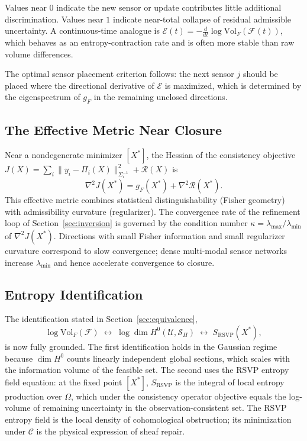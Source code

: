 \documentclass[11pt, oneside]{article}
\begin{document}
Values near $0$ indicate the new sensor or update contributes little additional
discrimination. Values near $1$ indicate near-total collapse of residual admissible
uncertainty. A continuous-time analogue is
$\mathcal{E}(t) = -\frac{d}{dt}\log \mathrm{Vol}_F(\mathcal{F}(t))$,
which behaves as an entropy-contraction rate and is often more stable than raw volume
differences.

The optimal sensor placement criterion follows: the next sensor $j$ should be placed
where the directional derivative of $\mathcal{E}$ is maximized, which is determined by
the eigenspectrum of $g_F$ in the remaining unclosed directions.

\subsection{The Effective Metric Near Closure}

Near a nondegenerate minimizer $[X^*]$, the Hessian of the consistency objective
$J(X) = \sum_i \|y_i - \Pi_i(X)\|_{\Sigma_i^{-1}}^2 + \mathcal{R}(X)$ is
\[
\nabla^2 J(X^*) = g_F(X^*) + \nabla^2 \mathcal{R}(X^*).
\]
This effective metric combines statistical distinguishability (Fisher geometry) with
admissibility curvature (regularizer). The convergence rate of the refinement loop of
Section~\ref{sec:inversion} is governed by the condition number
$\kappa = \lambda_{\max}/\lambda_{\min}$ of $\nabla^2 J(X^*)$. Directions with small
Fisher information and small regularizer curvature correspond to slow convergence; dense
multi-modal sensor networks increase $\lambda_{\min}$ and hence accelerate convergence
to closure.

\subsection{Entropy Identification}

The identification stated in Section~\ref{sec:equivalence},
\[
\log \mathrm{Vol}_F(\mathcal{F})
\;\longleftrightarrow\;
\log \dim H^0(\mathcal{U}, \mathcal{S}_\Pi)
\;\longleftrightarrow\;
S_{\mathrm{RSVP}}(X^*),
\]
is now fully grounded. The first identification holds in the Gaussian regime because
$\dim H^0$ counts linearly independent global sections, which scales with the information
volume of the feasible set. The second uses the RSVP entropy field equation: at the fixed
point $[X^*]$, $S_{\mathrm{RSVP}}$ is the integral of local entropy production over
$\Omega$, which under the consistency operator objective equals the log-volume of
remaining uncertainty in the observation-consistent set. The RSVP entropy field is the
local density of cohomological obstruction; its minimization under $\mathcal{C}$ is the
physical expression of sheaf repair.
\end{document}
